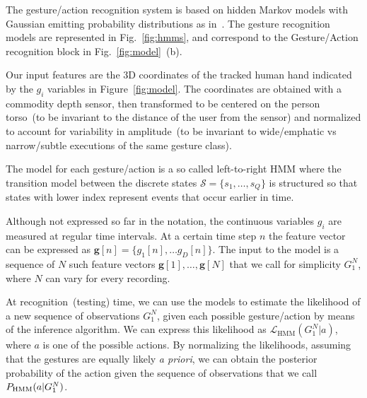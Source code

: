 The gesture/action recognition system is based on hidden Markov models with Gaussian emitting probability distributions as in~\cite{saponaro:2013:crhri}.
The gesture recognition models are represented in Fig.~\ref{fig:hmms}, and correspond to the Gesture/Action recognition block in Fig.~\ref{fig:model}~(b).

Our input features are the 3D coordinates of the tracked human hand indicated by the $g_i$ variables in Figure~\ref{fig:model}.
The coordinates are obtained with a commodity depth sensor, then transformed to be centered on the person torso~(to be invariant to the distance of the user from the sensor) and normalized to account for variability in amplitude~(to be invariant to wide/emphatic vs narrow/subtle executions of the same gesture class).

The model for each gesture/action is a so called left-to-right \ac{HMM} where the transition model between the discrete states $\mathcal{S} = \{s_1, \dots, s_Q\}$ is structured so that states with lower index represent events that occur earlier in time.

Although not expressed so far in the notation, the continuous variables $g_i$ are measured at regular time intervals.
At a certain time step $n$ the feature vector can be expressed as $\mathbf{g}[n] = \{g_1[n], \dots g_D[n]\}$.
The input to the model is a sequence of $N$ such feature vectors $\mathbf{g}[1], \dots, \mathbf{g}[N]$ that we call for simplicity $G_1^N$, where $N$ can vary for every recording.

At recognition~(testing) time, we can use the models to estimate the likelihood of a new sequence of observations $G_1^N$, given each possible gesture/action by means of the \FB{} inference algorithm.
We can express this likelihood as $\mathcal{L}_\text{HMM}(G_1^N|a)$, where $a$ is one of the possible actions.
By normalizing the likelihoods, assuming that the gestures are equally likely \emph{a priori}, we can obtain the posterior probability of the action given the sequence of observations that we call $P_{\text{HMM}}(a|G_1^N)$.

